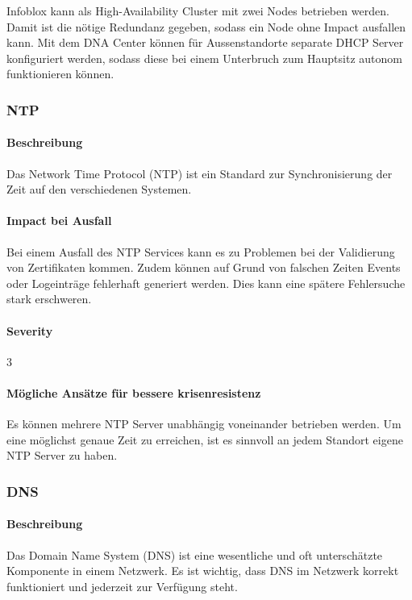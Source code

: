 Infoblox kann als High-Availability Cluster mit zwei Nodes betrieben werden. Damit ist die nötige Redundanz gegeben, sodass ein Node ohne Impact ausfallen kann. Mit dem DNA Center können für Aussenstandorte separate DHCP Server konfiguriert werden, sodass diese bei einem Unterbruch zum Hauptsitz autonom funktionieren können.


\subsubsection{NTP}
\paragraph{Beschreibung}
Das Network Time Protocol (NTP) ist ein Standard zur Synchronisierung der Zeit auf den verschiedenen Systemen.

\paragraph{Impact bei Ausfall}
Bei einem Ausfall des NTP Services kann es zu Problemen bei der Validierung von Zertifikaten kommen. Zudem können auf Grund von falschen Zeiten Events oder Logeinträge fehlerhaft generiert werden. Dies kann eine spätere Fehlersuche stark erschweren.

\paragraph{Severity} 3

\paragraph{Mögliche Ansätze für bessere krisenresistenz}
Es können mehrere NTP Server unabhängig voneinander betrieben werden. Um eine möglichst genaue Zeit zu erreichen, ist es sinnvoll an jedem Standort eigene NTP Server zu haben.

\subsubsection{DNS}
\paragraph{Beschreibung}
Das Domain Name System (DNS) ist eine wesentliche und oft unterschätzte Komponente in einem Netzwerk. Es ist wichtig, dass DNS im Netzwerk korrekt funktioniert und jederzeit zur Verfügung steht.

